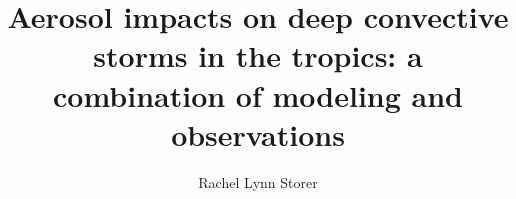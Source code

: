 \documentclass[12pt]{article}
\title{Aerosol impacts on deep convective storms in the tropics: a combination of modeling and observations}		%
\author{Rachel Lynn Storer}			%
\begin{document}


  \titlep			%
  \tableofcontents 		%
  
  
  
  \thebib			%
\end{document}
